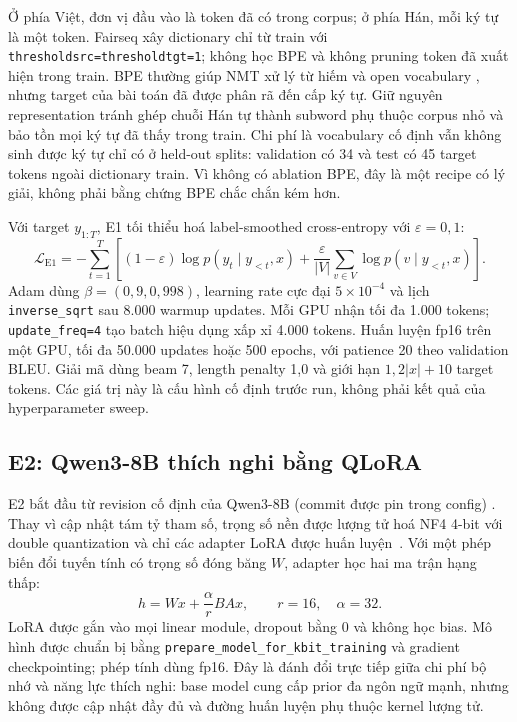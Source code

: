 Ở phía Việt, đơn vị đầu vào là token đã có trong corpus; ở phía Hán, mỗi ký
tự là một token. Fairseq xây dictionary chỉ từ train với
\texttt{thresholdsrc=thresholdtgt=1}; không học BPE và không pruning token đã
xuất hiện trong train. BPE thường giúp NMT xử lý từ hiếm và open vocabulary
\cite{sennrich2016subword}, nhưng target của bài toán đã được phân rã đến cấp
ký tự. Giữ nguyên representation tránh ghép chuỗi Hán tự thành subword phụ
thuộc corpus nhỏ và bảo tồn mọi ký tự đã thấy trong train. Chi phí là
vocabulary cố định vẫn không sinh được ký tự chỉ có ở held-out splits:
validation có 34 và test có 45 target tokens ngoài dictionary train. Vì không
có ablation BPE, đây là một recipe có lý giải, không phải bằng chứng BPE chắc
chắn kém hơn.

Với target $y_{1:T}$, E1 tối thiểu hoá label-smoothed cross-entropy với
$\varepsilon=0{,}1$:
\begin{equation}
  \mathcal{L}_{\mathrm{E1}}
  = -\sum_{t=1}^{T}\left[(1-\varepsilon)\log p(y_t\mid y_{<t},x)
  + \frac{\varepsilon}{|V|}\sum_{v\in V}\log p(v\mid y_{<t},x)\right].
  \label{eq:e1-loss}
\end{equation}
Adam dùng $\beta=(0{,}9,0{,}998)$, learning rate cực đại
$5\times10^{-4}$ và lịch \texttt{inverse\_sqrt} sau 8.000 warmup updates.
Mỗi GPU nhận tối đa 1.000 tokens; \texttt{update\_freq=4} tạo batch hiệu dụng
xấp xỉ 4.000 tokens. Huấn luyện fp16 trên một GPU, tối đa 50.000 updates hoặc
500 epochs, với patience 20 theo validation BLEU. Giải mã dùng beam 7,
length penalty 1,0 và giới hạn $1{,}2|x|+10$ target tokens. Các giá trị này là
cấu hình cố định trước run, không phải kết quả của hyperparameter sweep.

\subsection{E2: Qwen3-8B thích nghi bằng QLoRA}

E2 bắt đầu từ revision cố định của Qwen3-8B (commit được pin trong config)
\cite{qwen3technicalreport}. Thay vì cập nhật tám tỷ tham số, trọng số nền
được lượng tử hoá NF4 4-bit với double quantization và chỉ các adapter LoRA
được huấn luyện~\cite{hu2021lora,dettmers2023qlora}. Với một phép biến đổi
tuyến tính có trọng số đóng băng $W$, adapter học hai ma trận hạng thấp:
\begin{equation}
  h = Wx + \frac{\alpha}{r}BAx,
  \qquad r=16,\quad \alpha=32.
  \label{eq:lora}
\end{equation}
LoRA được gắn vào mọi linear module, dropout bằng 0 và không học bias. Mô hình
được chuẩn bị bằng \texttt{prepare\_model\_for\_kbit\_training} và gradient
checkpointing; phép tính dùng fp16. Đây là đánh đổi trực tiếp giữa chi phí bộ
nhớ và năng lực thích nghi: base model cung cấp prior đa ngôn ngữ mạnh, nhưng
không được cập nhật đầy đủ và đường huấn luyện phụ thuộc kernel lượng tử.

